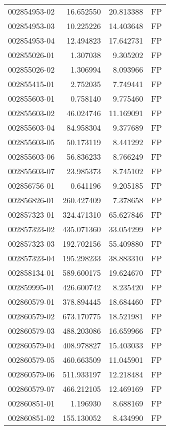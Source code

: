 \begin{tabular}{lrrl}
002854953-02 &   16.652550 &    20.813388 &   FP \\
002854953-03 &   10.225226 &    14.403648 &   FP \\
002854953-04 &   12.494823 &    17.642731 &   FP \\
002855026-01 &    1.307038 &     9.305202 &   FP \\
002855026-02 &    1.306994 &     8.093966 &   FP \\
002855415-01 &    2.752035 &     7.749441 &   FP \\
002855603-01 &    0.758140 &     9.775460 &   FP \\
002855603-02 &   46.024746 &    11.169091 &   FP \\
002855603-04 &   84.958304 &     9.377689 &   FP \\
002855603-05 &   50.173119 &     8.441292 &   FP \\
002855603-06 &   56.836233 &     8.766249 &   FP \\
002855603-07 &   23.985373 &     8.745102 &   FP \\
002856756-01 &    0.641196 &     9.205185 &   FP \\
002856826-01 &  260.427409 &     7.378658 &   FP \\
002857323-01 &  324.471310 &    65.627846 &   FP \\
002857323-02 &  435.071360 &    33.054299 &   FP \\
002857323-03 &  192.702156 &    55.409880 &   FP \\
002857323-04 &  195.298233 &    38.883310 &   FP \\
002858134-01 &  589.600175 &    19.624670 &   FP \\
002859995-01 &  426.600742 &     8.235420 &   FP \\
002860579-01 &  378.894445 &    18.684460 &   FP \\
002860579-02 &  673.170775 &    18.521981 &   FP \\
002860579-03 &  488.203086 &    16.659966 &   FP \\
002860579-04 &  408.978827 &    15.403033 &   FP \\
002860579-05 &  460.663509 &    11.045901 &   FP \\
002860579-06 &  511.933197 &    12.218484 &   FP \\
002860579-07 &  466.212105 &    12.469169 &   FP \\
002860851-01 &    1.196930 &     8.688169 &   FP \\
002860851-02 &  155.130052 &     8.434990 &   FP \\

\end{tabular}
